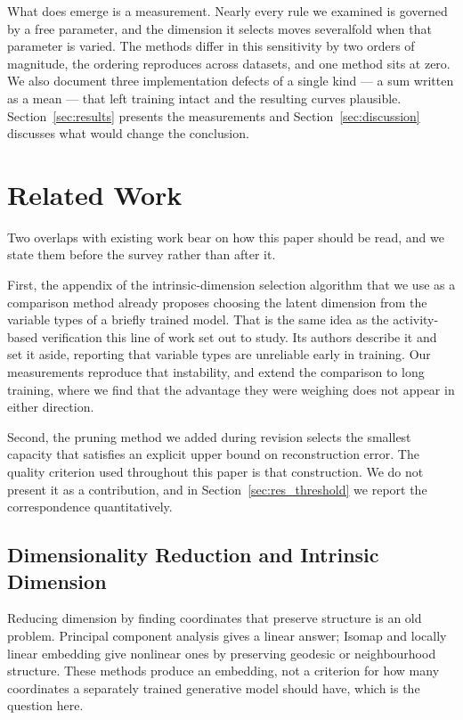 \documentclass[make,article,submit,pdftex,moreauthors]{Definitions/mdpi}
\begin{document}
What does emerge is a measurement. Nearly every rule we examined is
governed by a free parameter, and the dimension it selects moves
severalfold when that parameter is varied. The methods differ in this
sensitivity by two orders of magnitude, the ordering reproduces across
datasets, and one method sits at zero. We also document three
implementation defects of a single kind --- a sum written as a mean --- that
left training intact and the resulting curves plausible. Section~\ref{sec:results}
presents the measurements and Section~\ref{sec:discussion} discusses what
would change the conclusion.

\section{Related Work}\label{sec:related}

Two overlaps with existing work bear on how this paper should be read, and
we state them before the survey rather than after it.

First, the appendix of the intrinsic-dimension selection algorithm that we
use as a comparison method already proposes choosing the latent dimension
from the variable types of a briefly trained model. That is the same idea
as the activity-based verification this line of work set out to study. Its
authors describe it and set it aside, reporting that variable types are
unreliable early in training. Our measurements reproduce that instability,
and extend the comparison to long training, where we find that the
advantage they were weighing does not appear in either direction.

Second, the pruning method we added during revision selects the smallest
capacity that satisfies an explicit upper bound on reconstruction error.
The quality criterion used throughout this paper is that construction. We
do not present it as a contribution, and in Section~\ref{sec:res_threshold}
we report the correspondence quantitatively.

\subsection{Dimensionality Reduction and Intrinsic Dimension}\label{sec:rel_dr}

Reducing dimension by finding coordinates that preserve structure is an old
problem. Principal component analysis gives a linear answer; Isomap and
locally linear embedding give nonlinear ones by preserving geodesic or
neighbourhood structure. These methods produce an embedding, not a
criterion for how many coordinates a separately trained generative model
should have, which is the question here.
\end{document}

